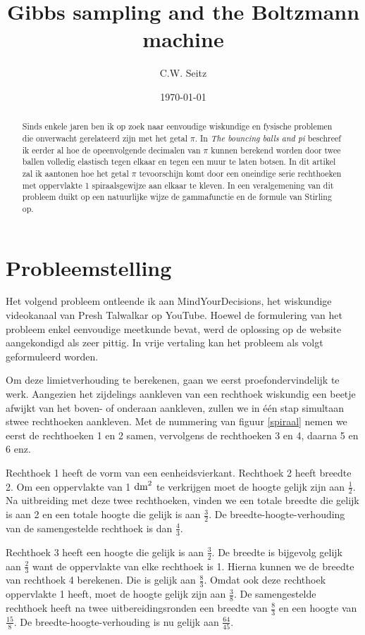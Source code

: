 \documentclass{article}
\title{Gibbs sampling and the Boltzmann machine}
\author{C.W. Seitz}
\date{\today}
\begin{document}
\maketitle

\begin{abstract}
\noindent Sinds enkele jaren ben ik op zoek naar eenvoudige wiskundige en fysische problemen die onverwacht gerelateerd zijn met het getal $\pi$. In \emph{The bouncing balls and pi} beschreef ik eerder al hoe de opeenvolgende decimalen van $\pi$ kunnen berekend worden door twee ballen volledig elastisch tegen elkaar en tegen een muur te laten botsen. In dit artikel zal ik aantonen hoe het getal $\pi$ tevoorschijn komt door een oneindige serie rechthoeken met oppervlakte 1 spiraalsgewijze aan elkaar te kleven. In een veralgemening van dit probleem duikt op een natuurlijke wijze de gammafunctie en de formule van Stirling op.    
\end{abstract}

\section{Probleemstelling}

Het volgend probleem ontleende ik aan MindYourDecisions, het wiskundige videokanaal van Presh Talwalkar op YouTube. Hoewel de formulering van het probleem enkel eenvoudige meetkunde bevat, werd de oplossing op de website aangekondigd als zeer pittig. In vrije vertaling kan het probleem als volgt geformuleerd worden.



Om deze limietverhouding te berekenen, gaan we eerst proefondervindelijk te werk. Aangezien het zijdelings aankleven van een rechthoek wiskundig een beetje afwijkt van het boven- of onderaan aankleven, zullen we in één stap simultaan stwee rechthoeken aankleven. Met de nummering van figuur \ref{spiraal} nemen we eerst de rechthoeken 1 en 2 samen, vervolgens de rechthoeken 3 en 4, daarna 5 en 6 enz.  

Rechthoek 1 heeft de vorm van een eenheidsvierkant. Rechthoek 2 heeft breedte 2. Om een oppervlakte van 1 $\rm{dm}^2$ te verkrijgen moet de hoogte gelijk zijn aan $\frac{1}{2}$. Na uitbreiding met deze twee rechthoeken, vinden we een totale breedte die gelijk is aan 2 en een totale hoogte die gelijk is aan $\frac{3}{2}$. De breedte-hoogte-verhouding van de samengestelde rechthoek is dan  $\frac{4}{3}$.

Rechthoek 3 heeft een hoogte die gelijk is aan $\frac{3}{2}$. De breedte is bijgevolg gelijk aan $\frac{2}{3}$ want de oppervlakte van elke rechthoek is 1. Hierna kunnen we de breedte van rechthoek 4 berekenen. Die is gelijk aan $\frac{8}{3}$. Omdat ook deze rechthoek oppervlakte 1 heeft, moet de hoogte gelijk zijn aan $\frac{3}{8}$. De samengestelde rechthoek heeft na twee uitbereidingsronden een breedte van $\frac{8}{3}$ en een hoogte van $\frac{15}{8}$. De breedte-hoogte-verhouding is nu gelijk aan $\frac{64}{45}$.
\end{document}

